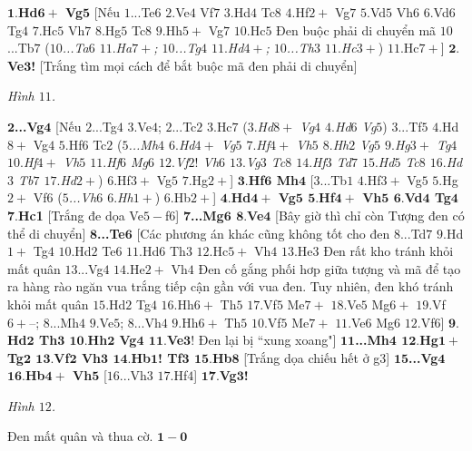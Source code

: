 \begin{multicols}{2}
	\vskip 0.1cm
	$\pmb{1.}$\textbf{\color{gocco}Hd$\pmb{6+}$ Vg}$\pmb{5}$ [Nếu $1$...Te$6$ $2.$Ve$4$ Vf$7$ $3.$Hd$4$ Tc$8$ $4.$Hf$2+$ Vg$7$ $5.$Vd$5$ Vh$6$ $6.$Vd$6$ Tg$4$ $7.$Hc$5$ Vh$7$ $8.$Hg$5$ Tc$8$ $9.$Hh$5+$ Vg$7$ $10.$Hc$5$ 
	\vskip 0.1cm
	Đen buộc phải di chuyển mã $10$...Tb$7$ (\textit{$10$...Ta$6$ $11.$Ha$7+$; $10$...Tg$4$ $11.$Hd$4+$; $10$...Th$3$ $11.$Hc$3+$}) $11.$Hc$7+$]
	\vskip 0.1cm
	$\pmb{2.}$\textbf{\color{gocco}Ve$\pmb{3}$!} [Trắng tìm mọi cách để bắt buộc mã đen phải di chuyển]
	\begin{center}
		\newgame
		\scalebox{0.85}\showboard
		\vskip 0.1cm
		\textit{\small\color{gocco}Hình $11$.}
	\end{center}
	$\pmb{2}$\textbf{\color{gocco}...Vg}$\pmb{4}$ [Nếu $2$...Tg$4$ $3.$Ve$4$; $2$...Tc$2$ $3.$Hc$7$ ($3.$\textit{Hd$8+$ Vg$4$ $4.$Hd$6$ Vg$5$}) $3$...Tf$5$ $4.$Hd$8+$ Vg$4$ $5.$Hf$6$ Tc$2$ (\textit{$5$...Mh$4$ $6.$Hd$4+$ Vg$5$ $7.$Hf$4+$ Vh$5$ $8.$Hh$2$ Vg$5$ $9.$Hg$3+$ Tg$4$ $10.$Hf$4+$ Vh$5$ $11.$Hf$6$ Mg$6$ $12.$Vf$2!$ Vh$6$ $13.$Vg$3$ Tc$8$ $14.$Hf$3$ Td$7$ $15.$Hd$5$ Tc$8$ $16.$Hd$3$ Tb$7$ $17.$Hd$2+$}) $6.$Hf$3+$ Vg$5$ $7.$Hg$2+$]
	\vskip 0.1cm
	$\pmb{3.}$\textbf{\color{gocco}Hf$\pmb{6}$ Mh}$\pmb{4}$ [$3$...Tb$1$ $4.$Hf$3+$ Vg$5$ $5.$Hg$2+$ Vf$6$ (\textit{$5$...Vh$6$ $6.$Hh$1+$}) $6.$Hb$2+$]
	\vskip 0.1cm
	$\pmb{4.}$\textbf{\color{gocco}Hd$\pmb{4+}$ Vg$\pmb{5}$ $\pmb{5.}$Hf$\pmb{4+}$ Vh$\pmb{5}$ $\pmb{6.}$Vd$\pmb{4}$ Tg$\pmb{4}$ $\pmb{7.}$Hc1} [Trắng đe dọa Ve$5-$f$6$]
	\vskip 0.1cm
	$\pmb{7}$\textbf{\color{gocco}...Mg$\pmb{6}$ $\pmb{8.}$Ve}$\pmb{4}$ [Bây giờ thì chỉ còn Tượng đen có thể di chuyển]
	\vskip 0.1cm
	$\pmb{8}$\textbf{\color{gocco}...Te}$\pmb{6}$ [Các phương án khác cũng không tốt cho đen $8$...Td$7$ $9.$Hd$1+$ Tg$4$ $10.$Hd$2$ Te$6$ $11.$Hd$6$ Th$3$ $12.$Hc$5+$ Vh$4$ $13.$He$3$ Đen rất kho tránh khỏi mất quân $13$...Vg$4$ $14.$He$2+$ Vh$4$ Đen cố gắng phối hơp giữa tượng và mã để tạo ra hàng rào ngăn vua trắng tiếp cận gần với vua đen. Tuy nhiên, đen khó tránh khỏi mất quân $15.$Hd$2$ Tg$4$ $16.$Hh$6+$ Th$5$ $17.$Vf$5$ Me$7+$ $18.$Ve$5$ Mg$6+$ $19.$Vf$6+–$; $8$...Mh$4$ $9.$Ve$5$; $8$...Vh$4$ $9.$Hh$6+$ Th$5$ $10.$Vf$5$ Me$7+$ $11.$Ve$6$ Mg$6$ $12.$Vf$6$]
	\vskip 0.1cm
	$\pmb{9.}$\textbf{\color{gocco}Hd$\pmb{2}$ Th$\pmb{3}$ $\pmb{10.}$Hh$\pmb{2}$ Vg$\pmb{4}$ $\pmb{11.}$Ve$\pmb{3!}$} 
	Đen lại bị ``xung xoang"]
	\vskip 0.1cm
	$\pmb{11}$\textbf{\color{gocco}...Mh$\pmb{4}$ $\pmb{12.}$Hg$\pmb{1+}$ Tg$\pmb{2}$ $\pmb{13.}$Vf$\pmb{2}$ Vh$\pmb{3}$ $\pmb{14.}$Hb$\pmb{1}$! Tf$\pmb{3}$ $\pmb{15.}$Hb}$\pmb{8}$ [Trắng dọa chiếu hết ở g$3$]
	\vskip 0.1cm
	$\pmb{15}$\textbf{\color{gocco}...Vg$\pmb{4}$ $\pmb{16.}$Hb$\pmb{4+}$ Vh}$\pmb{5}$ [$16$...Vh$3$ $17.$Hf$4$]
	\vskip 0.1cm
	$\pmb{17.}$\textbf{\color{gocco}Vg$\pmb{3}$!}
	\begin{center}
		\newgame
		\scalebox{0.85}\showboard
		\vskip 0.1cm
		\textit{\small\color{gocco}Hình $12$.}
		\end{center}
	\vskip 0.1cm
	Đen mất quân và thua cờ.
	\vskip 0.1cm
	$\pmb{1-0}$
\end{multicols}